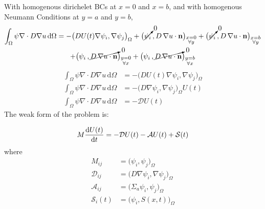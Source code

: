 \documentclass[a4paper]{article}
\begin{document}
    With homogenous dirichelet BCs at $x=0$ and $x=b$, and with homogenous Neumann Conditions at $y=a$ and $y=b$,
    \begin{multline}
        \int_\Omega \psi \nabla \cdot D \nabla u\, \mathrm{d}\Omega = - \big(D U(t) \nabla \psi_i, \nabla \psi_j \big)_\Omega  +  \big(\cancelto{0}{\psi_i} \,, D \, \nabla u\cdot \mathbf{n}\big)_{\substack{x=0\\\forall y}} +  \big(\cancelto{0}{\psi_i} \,, D \, \nabla u\cdot \mathbf{n}\big)_{\substack{x=b\\\forall y}} \\ +  \big(\psi_i \,, \cancelto{0}{D \, \nabla u\cdot \mathbf{n}}\big)_{\substack{y=0\\\forall x}} +  \big(\psi_i \,,\cancelto{0}{D \, \nabla u\cdot \mathbf{n}}\big)_{\substack{y=b\\\forall x}}
    \end{multline}
    \begin{align}
        \int_\Omega \psi \nabla \cdot D \nabla u\, \mathrm{d}\Omega &= - \big(D U(t) \nabla \psi_i, \nabla \psi_j \big)_\Omega \label{eq:weak_form_diffusion_laplacian_2d_after_homogenous_bcs}\\
        \int_\Omega \psi \nabla \cdot D \nabla u\, \mathrm{d}\Omega &= - \big( D \nabla \psi_i, \nabla \psi_j \big)_\Omega U(t) \\
        \int_\Omega \psi \nabla \cdot D \nabla u\, \mathrm{d}\Omega &= - \mathcal{D} U(t)
    \end{align}
    The weak form of the problem  is:

    \begin{equation}\label{eq:systemeqn}
        M \diff{U(t)}{t} = -\mathcal{D} U(t) - \mathcal{A} U(t) + \mathcal{S}(t)
    \end{equation}
    where
    \begin{align}
        M_{ij} &= \big(\psi_i,\psi_j)_\Omega \\
        \mathcal{D}_{ij} &= \big(D \nabla \psi_i,\nabla \psi_j)_\Omega \\
        \mathcal{A}_{ij} &= \big(\Sigma_a \psi_i,\psi_j)_\Omega \\
            \mathcal{S}_{i}(t) &= \big(\psi_i,S(x,t))_\Omega
    \end{align}
\end{document}

